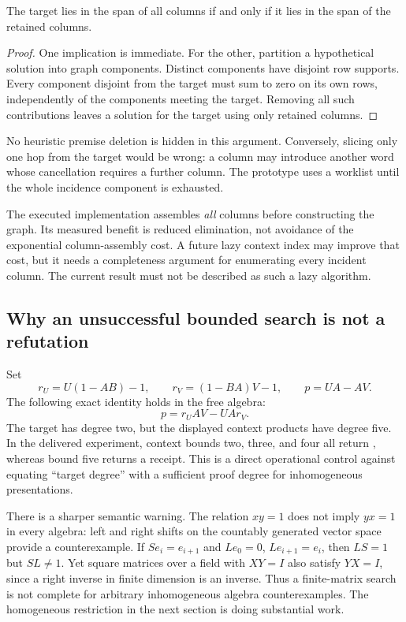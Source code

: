 \begin{proposition}\label{prop:slicing}
The target lies in the span of all columns if and only if it lies in the span of
the retained columns.
\end{proposition}
\begin{proof}
One implication is immediate. For the other, partition a hypothetical solution
into graph components. Distinct components have disjoint row supports. Every
component disjoint from the target must sum to zero on its own rows, independently
of the components meeting the target. Removing all such contributions leaves a
solution for the target using only retained columns.
\end{proof}

No heuristic premise deletion is hidden in this argument. Conversely, slicing
only one hop from the target would be wrong: a column may introduce another word
whose cancellation requires a further column. The prototype uses a worklist
until the whole incidence component is exhausted.

The executed implementation assembles \emph{all} columns before constructing
the graph. Its measured benefit is reduced elimination, not avoidance of the
exponential column-assembly cost. A future lazy context index may improve that
cost, but it needs a completeness argument for enumerating every incident
column. The current result must not be described as such a lazy algorithm.

\subsection{Why an unsuccessful bounded search is not a refutation}

Set
\[
 r_U=U(1-AB)-1,\qquad r_V=(1-BA)V-1,\qquad p=UA-AV.
\]
The following exact identity holds in the free algebra:
\begin{equation}\label{eq:push}
 p=r_UAV-UA r_V.
\end{equation}
The target has degree two, but the displayed context products have degree five.
In the delivered experiment, context bounds two, three, and four all return
\unknown{}, whereas bound five returns a receipt. This is a direct operational
control against equating ``target degree'' with a sufficient proof degree for
inhomogeneous presentations.

There is a sharper semantic warning. The relation $xy=1$ does not imply $yx=1$
in every algebra: left and right shifts on the countably generated vector space
provide a counterexample. If $S e_i=e_{i+1}$ and $L e_0=0$, $L e_{i+1}=e_i$,
then $LS=1$ but $SL\ne1$. Yet square matrices over a field with $XY=I$ also
satisfy $YX=I$, since a right inverse in finite dimension is an inverse. Thus a
finite-matrix search is not complete for arbitrary inhomogeneous algebra
counterexamples. The homogeneous restriction in the next section is doing
substantial work.

